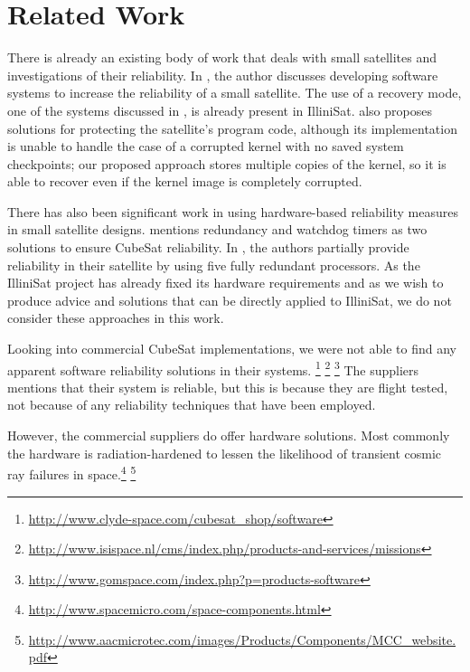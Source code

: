 \section{Related Work}\label{sec:related_work}
There is already an existing body of work that deals with small satellites and
investigations of their reliability.  In \cite{odegaard2013error}, the author
discusses developing software systems to increase the reliability of a small satellite.
The use of a recovery mode, one of the systems discussed in
\cite{odegaard2013error}, is already present in IlliniSat.
\cite{odegaard2013error} also proposes solutions for protecting the satellite's
program code, although its implementation is unable to handle the case of a
corrupted kernel with no saved system checkpoints; our proposed approach stores
multiple copies of the kernel, so it is able to recover even if the kernel image
is completely corrupted.

There has also been significant work in using hardware-based reliability measures in small satellite designs.  \cite{toorian2008cubesat} mentions redundancy and watchdog timers as two solutions to ensure CubeSat reliability.  In \cite{passerone2008design}, the authors partially provide reliability in their satellite by using five fully redundant processors.   As the IlliniSat project has already fixed its hardware requirements and as we wish to produce advice and solutions that can be directly applied to IlliniSat, we do not consider these approaches in this work.


Looking into commercial CubeSat implementations, we were not able to 
find any apparent software reliability solutions in their systems.
\footnote{\url{http://www.clyde-space.com/cubesat_shop/software}}
\footnote{\url{http://www.isispace.nl/cms/index.php/products-and-services/missions}}
\footnote{\url{http://www.gomspace.com/index.php?p=products-software}}
The suppliers mentions that their system is reliable, but this is because
they are flight tested, not because of any reliability techniques that
have been employed.

However, the commercial suppliers do offer hardware solutions. Most commonly
the hardware is radiation-hardened to lessen the likelihood of transient cosmic ray
failures in space.\footnote{\url{http://www.spacemicro.com/space-components.html}}
\footnote{\url{http://www.aacmicrotec.com/images/Products/Components/MCC_website.pdf}}




